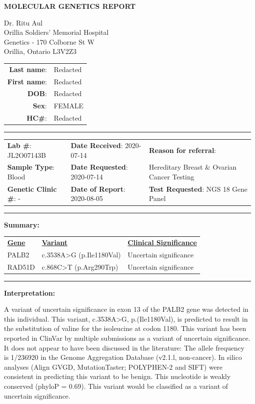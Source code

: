 \documentclass[10pt]{article}
\begin{document}
\begin{center}
\large \bf MOLECULAR GENETICS REPORT
\end{center}

\parbox{.45\textwidth}{
Dr. Ritu Aul \\
Orillia Soldiers' Memorial Hospital\\
Genetics - 170 Colborne St W \\
Orillia, Ontario L3V2Z3
}\hfill
\parbox{.45\textwidth}{
\begin{tabular}{r l}
{\bf Last name}:& Redacted\\
{\bf First name}: & Redacted\\
{\bf DOB}: & Redacted\\
{\bf Sex}: & FEMALE \\
{\bf HC\#}: & Redacted\\
\end{tabular}
}

\rule{\textwidth}{1pt}

\begin{tabular}{l l l}
{\bf Lab \#}: JL2O07143B & {\bf Date Received}: 2020-07-14 & {\bf Reason for referral}:\\
{\bf Sample Type}: Blood & {\bf Date Requested}: 2020-07-14 & Hereditary Breast \& Ovarian Cancer Testing \\
{\bf Genetic Clinic \#}: - & {\bf Date of Report}: 2020-08-05 & {\bf Test Requested}: NGS 18 Gene Panel
\end{tabular}

\rule{\textwidth}{1pt}

{\bf Summary:}

\vspace{-24pt}
\begin{tabular}{>{\centering\arraybackslash}p{5cm} >{\centering\arraybackslash}p{6cm} >{\centering\arraybackslash}p{4cm}}
\underline{\bf Gene} & \underline{\bf Variant} & \underline{\bf Clinical Significance} \\
PALB2 & c.3538A>G (p.Ile1180Val) & Uncertain significance \\
RAD51D & c.868C>T (p.Arg290Trp) & Uncertain significance \\
\end{tabular}
 
\rule{\textwidth}{1pt}

{\bf Interpretation:}

A variant of uncertain significance in exon 13 of the PALB2 gene was detected in this individual. This variant, c.3538A>G, p.(Ile1180Val), is predicted to result in the substitution of valine for the isoleucine at codon 1180. This variant has been reported in ClinVar by multiple submissions as a variant of uncertain significance. It does not appear to have been discussed in the literature: The allele frequency is 1/236920 in the Genome Aggregation Database (v2.1.l, non-cancer). In silico analyses (Align GVGD, MutationTaster; POLYPHEN-2 and SIFT) were consistent in predicting this variant to be benign. This nucleotide is weakly conserved (phyloP = 0.69). This variant would be classified as a variant of uncertain significance. 
\end{document}
